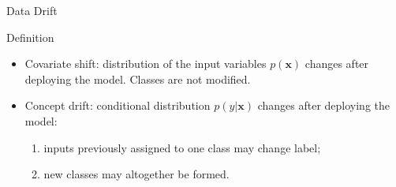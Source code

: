 \begin{frame}{Data Drift}
    \begin{definitionblock}{Definition}
        \begin{itemize}
            \item <1-> Covariate shift: distribution of the input variables $p(\mathbf{x})$ changes after deploying the model. Classes are not modified.
            \item <2-> Concept drift: conditional distribution $p(y|\mathbf{x})$ changes after deploying the model:
            \begin{enumerate}
                \item <3-> inputs previously assigned to one class may change label;
                \item <4-> new classes may altogether be formed.
            \end{enumerate}
        \end{itemize}
    \end{definitionblock}

\end{frame}

